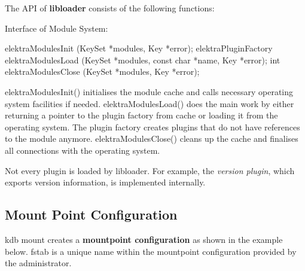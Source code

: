 The A\+P\+I of {\bfseries libloader} consists of the following functions\+:

Interface of Module System\+: \begin{DoxyVerb}    elektraModulesInit (KeySet *modules, Key *error); elektraPluginFactory
    elektraModulesLoad (KeySet *modules,
                    const char *name, Key *error);
    int elektraModulesClose (KeySet *modules, Key *error);
\end{DoxyVerb}


{\ttfamily elektra\+Modules\+Init()} initialises the module cache and calls necessary operating system facilities if needed. {\ttfamily elektra\+Modules\+Load()} does the main work by either returning a pointer to the plugin factory from cache or loading it from the operating system. The plugin factory creates plugins that do not have references to the module anymore. {\ttfamily elektra\+Modules\+Close()} cleans up the cache and finalises all connections with the operating system.

Not every plugin is loaded by {\ttfamily libloader}. For example, the {\itshape version plugin}, which exports version information, is implemented internally.

\subsection*{Mount Point Configuration}

{\ttfamily kdb mount} creates a {\bfseries mountpoint configuration} as shown in the example below. {\ttfamily fstab} is a unique name within the mountpoint configuration provided by the administrator.

